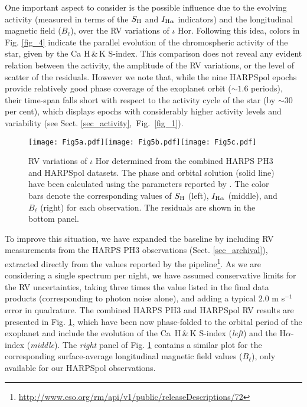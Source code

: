 \documentclass[a4paper,fleqn,usenatbib]{mnras}
\begin{document}
One important aspect to consider is the possible influence due to the evolving activity (measured in terms of the $S_{\rm H}$ and $I_{\rm H\alpha}$ indicators) and the longitudinal magnetic field ($B_{\ell}$), over the RV variations of $\iota$ Hor. Following this idea, colors in Fig. \ref{fig_4} indicate the parallel evolution of the chromospheric activity of the star, given by the Ca H\,\&\,K S-index. This comparison does not reveal any evident relation between the activity, the amplitude of the RV variations, or the level of scatter of the residuals. However we note that, while the nine HARPSpol epochs provide relatively good phase coverage of the exoplanet orbit ($\sim$$1.6$ periods), their time-span falls short with respect to the activity cycle of the star (by $\sim$$30$ per cent), which displays epochs with considerably higher activity levels and variability (see Sect. \ref{sec_activity},~Fig.~\ref{fig_1}). 

\begin{figure*} %
\texttt{[image: Fig5a.pdf]}\texttt{[image: Fig5b.pdf]}\texttt{[image: Fig5c.pdf]}
\caption{RV variations of $\iota$ Hor determined from the combined HARPS PH3 and HARPSpol datasets. The phase and orbital solution (solid line) have been calculated using the parameters reported by . The color bars denote the corresponding values of $S_{\rm H}$ (left), $I_{\rm H\alpha}$ (middle), and $B_{\ell}$ (right) for each observation. The residuals are shown in the bottom panel.}\label{fig_5}
\end{figure*}

To improve this situation, we have expanded the baseline by including RV measurements from the HARPS PH3 observations (Sect. \ref{sec_archival}), extracted directly from the values reported by the pipeline\footnote[17]{\url{http://www.eso.org/rm/api/v1/public/releaseDescriptions/72}}. As we are considering a single spectrum per night, we have assumed conservative limits for the RV uncertainties, taking three times the value listed in the final data products (corresponding to photon noise alone), and adding a typical $2.0$ m s$^{-1}$ error in quadrature. The combined HARPS PH3 and HARPSpol RV results are presented in Fig. \ref{fig_5}, which have been now phase-folded to the orbital period of the exoplanet and include the evolution of the Ca~H\,\&\,K S-index (\textit{left}) and the H$\alpha$-index (\textit{middle}). The \textit{right} panel of Fig. \ref{fig_5} contains a similar plot for the corresponding surface-average longitudinal magnetic field values ($B_{\ell}$), only available for our HARPSpol observations.
\end{document}
